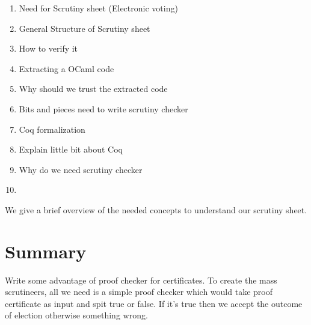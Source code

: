 \begin{enumerate}
\item Need for Scrutiny sheet (Electronic voting)
\item General Structure of Scrutiny sheet
\item How to verify it
\item Extracting a OCaml code
\item Why should we trust the extracted code
\item Bits and pieces need to write scrutiny checker
\item Coq formalization
\item Explain little bit about Coq
\item Why do we need scrutiny checker
\item 
\end{enumerate}



We give a brief overview of the needed concepts to understand our scrutiny sheet.


























        

  
\section{Summary}
   Write some advantage of proof checker for certificates.
   To create the mass scrutineers, all we need is a simple proof checker
   which would take proof certificate as input and spit true or false.
   If it's true then we accept the outcome of election otherwise something 
   wrong.
 










































   
   
   
   
   
   